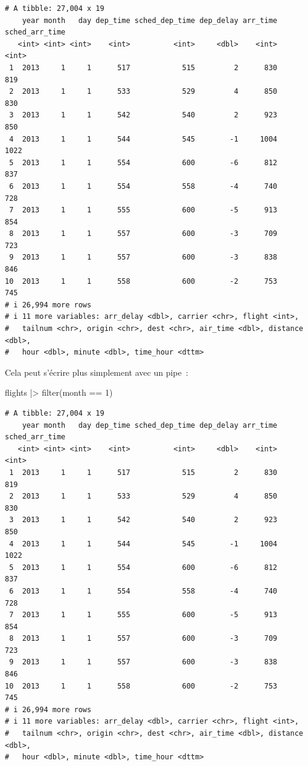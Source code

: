 \documentclass[
  letterpaper,
  DIV=11,
  numbers=noendperiod,
  oneside]{scrreprt}
\newenvironment{Shaded}{\begin{snugshade}}{\end{snugshade}}
\newcommand{\DecValTok}[1]{\textcolor[rgb]{0.68,0.00,0.00}{#1}}
\newcommand{\FunctionTok}[1]{\textcolor[rgb]{0.28,0.35,0.67}{#1}}
\newcommand{\NormalTok}[1]{\textcolor[rgb]{0.00,0.23,0.31}{#1}}
\newcommand{\SpecialCharTok}[1]{\textcolor[rgb]{0.37,0.37,0.37}{#1}}
\begin{document}
\begin{verbatim}
# A tibble: 27,004 x 19
    year month   day dep_time sched_dep_time dep_delay arr_time sched_arr_time
   <int> <int> <int>    <int>          <int>     <dbl>    <int>          <int>
 1  2013     1     1      517            515         2      830            819
 2  2013     1     1      533            529         4      850            830
 3  2013     1     1      542            540         2      923            850
 4  2013     1     1      544            545        -1     1004           1022
 5  2013     1     1      554            600        -6      812            837
 6  2013     1     1      554            558        -4      740            728
 7  2013     1     1      555            600        -5      913            854
 8  2013     1     1      557            600        -3      709            723
 9  2013     1     1      557            600        -3      838            846
10  2013     1     1      558            600        -2      753            745
# i 26,994 more rows
# i 11 more variables: arr_delay <dbl>, carrier <chr>, flight <int>,
#   tailnum <chr>, origin <chr>, dest <chr>, air_time <dbl>, distance <dbl>,
#   hour <dbl>, minute <dbl>, time_hour <dttm>
\end{verbatim}

Cela peut s'écrire plus simplement avec un pipe~:

\begin{Shaded}
\begin{Highlighting}[]
\NormalTok{flights }\SpecialCharTok{|\textgreater{}} \FunctionTok{filter}\NormalTok{(month }\SpecialCharTok{==} \DecValTok{1}\NormalTok{)}
\end{Highlighting}
\end{Shaded}

\begin{verbatim}
# A tibble: 27,004 x 19
    year month   day dep_time sched_dep_time dep_delay arr_time sched_arr_time
   <int> <int> <int>    <int>          <int>     <dbl>    <int>          <int>
 1  2013     1     1      517            515         2      830            819
 2  2013     1     1      533            529         4      850            830
 3  2013     1     1      542            540         2      923            850
 4  2013     1     1      544            545        -1     1004           1022
 5  2013     1     1      554            600        -6      812            837
 6  2013     1     1      554            558        -4      740            728
 7  2013     1     1      555            600        -5      913            854
 8  2013     1     1      557            600        -3      709            723
 9  2013     1     1      557            600        -3      838            846
10  2013     1     1      558            600        -2      753            745
# i 26,994 more rows
# i 11 more variables: arr_delay <dbl>, carrier <chr>, flight <int>,
#   tailnum <chr>, origin <chr>, dest <chr>, air_time <dbl>, distance <dbl>,
#   hour <dbl>, minute <dbl>, time_hour <dttm>
\end{verbatim}
\end{document}
